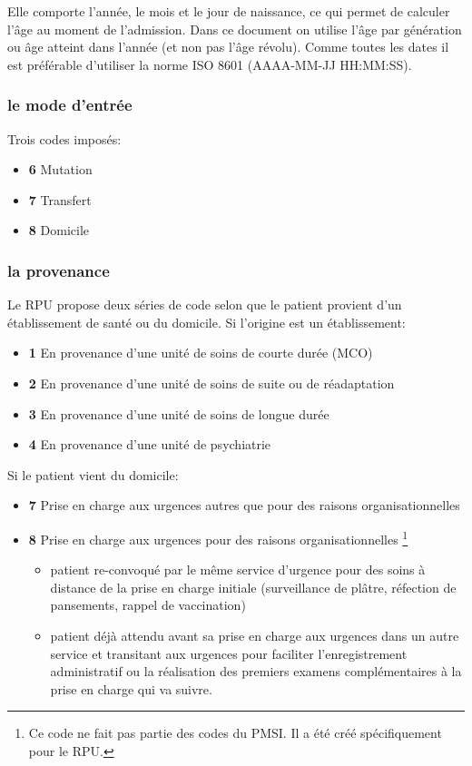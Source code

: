 \documentclass[12pt,english,french,twoside]{book}\usepackage[]{graphicx}\usepackage[]{color}
\begin{document}
Elle comporte l'année, le mois et le jour de naissance, ce qui permet de calculer l'âge au moment de l'admission. Dans ce document on utilise l'âge par génération ou âge atteint dans l'année (et non pas l'âge révolu). Comme toutes les dates il est préférable d'utiliser la norme ISO 8601 (AAAA-MM-JJ HH:MM:SS).

\subsubsection{le mode d'entrée}

Trois codes imposés:
\begin{itemize}
  \item \textbf{6} Mutation
  \item \textbf{7} Transfert
  \item \textbf{8} Domicile
\end{itemize}


\subsubsection{la provenance}

Le RPU propose deux séries de code selon que le patient provient d'un établissement de santé ou du domicile. Si l'origine est un établissement:
\begin{itemize}
  \item \textbf{1} En provenance d'une unité de soins de courte durée (MCO) 
  \item \textbf{2} En provenance d'une unité de soins de suite ou de réadaptation
  \item \textbf{3} En provenance d'une unité de soins de longue durée
  \item \textbf{4} En provenance d'une unité de psychiatrie
\end{itemize}
Si le patient vient du domicile:
\begin{itemize}
  \item \textbf{7} Prise en charge aux urgences autres que pour des raisons organisationnelles
  \item \textbf{8} Prise en charge aux urgences pour des raisons organisationnelles \footnote{Ce code ne fait pas partie des codes du PMSI. Il a été créé spécifiquement pour le RPU.}
    \begin{itemize}
      \item patient re-convoqué par le même service d’urgence pour des soins à distance de la prise en charge initiale (surveillance de plâtre, réfection de pansements, rappel de vaccination)
      \item patient déjà attendu avant sa prise en charge aux urgences dans un autre service et transitant aux urgences pour faciliter l’enregistrement administratif ou la réalisation des premiers examens complémentaires à la prise en charge qui va suivre.
    \end{itemize}
\end{itemize}
\end{document}
